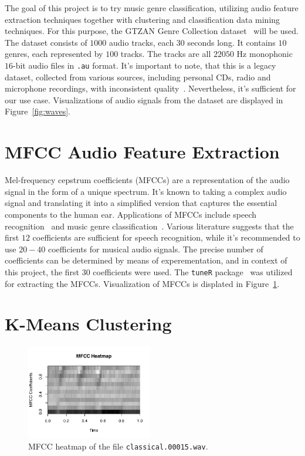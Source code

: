\documentclass[twocolumn]{article}
\begin{document}
The goal of this project is to try music genre classification, utilizing audio feature extraction techniques together with clustering and classification data mining techniques. For this purpose, the GTZAN Genre Collection dataset~\cite{tzanetakis_essl_cook_2001} will be used. The dataset consists of $1000$ audio tracks, each $30$ seconds long. It contains $10$ genres, each represented by $100$ tracks. The tracks are all $22050$ Hz monophonic $16$-bit audio files in \texttt{.au} format. It's important to note, that this is a legacy dataset, collected from various sources, including personal CDs, radio and microphone recordings, with inconsistent quality~\cite{sturm2013gtzan}. Nevertheless, it's sufficient for our use case. Visualizations of audio signals from the dataset are displayed in Figure~\ref{fig:waves}.
\section{MFCC Audio Feature Extraction}
Mel-frequency cepstrum coefficients (MFCCs) are a representation of the audio signal in the form of a unique spectrum. It's known to taking a complex audio signal and translating it into a simplified version that captures the essential components to the human ear. Applications of MFCCs include speech recognition~\cite{ganchev2005comparative} and music genre classification~\cite{lerch2012introduction}. Various literature suggests that the first $12$ coefficients are sufficient for speech recognition, while it's recommended to use $20-40$ coefficients for musical audio signals. The precise number of coefficients can be determined by means of experementation, and in context of this project, the first $30$ coefficients were used. The \texttt{tuneR} package~\cite{tuneR} was utilized for extracting the MFCCs. Visualization of MFCCs is displated in Figure~\ref{fig:mfcc}.
\section{K-Means Clustering}
\begin{figure}[hht]
\centering
\includegraphics[width=0.49\textwidth]{images/mfcc_heatmap_8.pdf}
\caption{MFCC heatmap of the file \texttt{classical.00015.wav}.}
\label{fig:mfcc}
\end{figure}
\blindtext
\end{document}
